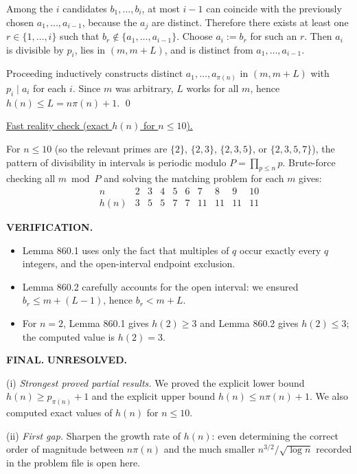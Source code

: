 Among the $i$ candidates $b_1,\dots,b_i$, at most $i-1$ can coincide with the previously chosen $a_1,\dots,a_{i-1}$, because the $a_j$ are distinct.
Therefore there exists at least one $r\in\{1,\dots,i\}$ such that $b_r\notin\{a_1,\dots,a_{i-1}\}$.
Choose $a_i:=b_r$ for such an $r$.
Then $a_i$ is divisible by $p_i$, lies in $(m,m+L)$, and is distinct from $a_1,\dots,a_{i-1}$.

Proceeding inductively constructs distinct $a_1,\dots,a_{\pi(n)}$ in $(m,m+L)$ with $p_i\mid a_i$ for each $i$.
Since $m$ was arbitrary, $L$ works for all $m$, hence $h(n)\le L = n\pi(n)+1$.
\qed

\medskip
\noindent\underline{Fast reality check (exact $h(n)$ for $n\le 10$).}

For $n\le 10$ (so the relevant primes are $\{2\}$, $\{2,3\}$, $\{2,3,5\}$, or $\{2,3,5,7\}$), the pattern of divisibility in intervals is periodic modulo $P=\prod_{p\le n} p$.
Brute-force checking all $m\bmod P$ and solving the matching problem for each $m$ gives:
\[
\begin{array}{c|ccccccccc}
 n & 2&3&4&5&6&7&8&9&10\\\hline
 h(n) & 3&5&5&7&7&11&11&11&11
\end{array}
\]

\medskip
\noindent\textbf{VERIFICATION.}

\begin{itemize}
\item Lemma 860.1 uses only the fact that multiples of $q$ occur exactly every $q$ integers, and the open-interval endpoint exclusion.
\item Lemma 860.2 carefully accounts for the open interval: we ensured $b_r\le m+(L-1)$, hence $b_r<m+L$.
\item For $n=2$, Lemma 860.1 gives $h(2)\ge 3$ and Lemma 860.2 gives $h(2)\le 3$; the computed value is $h(2)=3$.
\end{itemize}

\medskip
\noindent\textbf{FINAL.} \textbf{UNRESOLVED.}

(i) \emph{Strongest proved partial results.}
We proved the explicit lower bound $h(n)\ge p_{\pi(n)}+1$ and the explicit upper bound $h(n)\le n\pi(n)+1$.
We also computed exact values of $h(n)$ for $n\le 10$.

(ii) \emph{First gap.}
Sharpen the growth rate of $h(n)$: even determining the correct order of magnitude between $n\pi(n)$ and the much smaller $n^{3/2}/\sqrt{\log n}$ recorded in the problem file is open here.

